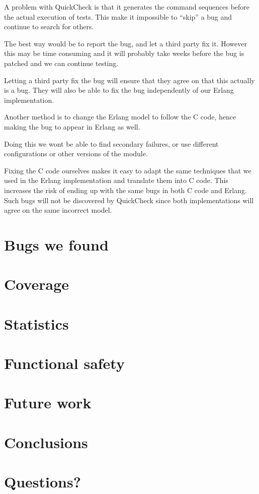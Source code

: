 \documentclass[a4paper]{article}
\begin{document}
A problem with QuickCheck is that it generates the command sequences
before the actual execution of tests. This make it impossible to
``skip'' a bug and continue to search for others.

The best way would be to report the bug, and let a third party fix
it. However this may be time consuming and it will probably take weeks
before the bug is patched and we can continue testing.

Letting a third party fix the bug will ensure that they agree on that
this actually is a bug. They will also be able to fix the bug
independently of our Erlang implementation.

Another method is to change the Erlang model to follow the C code,
hence making the bug to appear in Erlang as well.

Doing this we wont be able to find secondary failures, or use
different configurations or other versions of the module.

Fixing the C code ourselves makes it easy to adapt the same techniques
that we used in the Erlang implementation and translate them into C
code.
This increases the risk of ending up with the same bugs in both C code
and Erlang. Such bugs will not be discovered by QuickCheck since both
implementations will agree on the same incorrect model.

\section{Bugs we found}

\section{Coverage}
\section{Statistics}
\section{Functional safety}
\section{Future work}
\section{Conclusions}
\section{Questions?}
\end{document}
